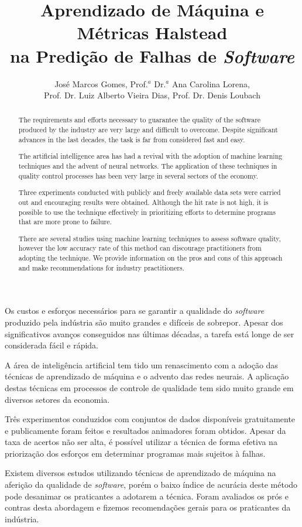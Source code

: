 \documentclass[10pt]{article}
\title{Aprendizado de Máquina e Métricas \textbf{Halstead}\\na Predição de Falhas de \textit{Software}}
\author{
    José Marcos Gomes\inst{1}\orcidIcon{0000-0001-9223-7512},
    Prof.$^a$ Dr.$^a$ Ana Carolina Lorena\inst{1}\orcidIcon{0000-0002-6140-571X}, \\
    Prof. Dr. Luiz Alberto Vieira Dias\inst{1}\orcidIcon{0000-0001-5958-8011},
    Prof. Dr. Denis Loubach\inst{1}\orcidIcon{0000-0003-1595-3448}
}
\begin{document}
 

\maketitle

\begin{abstract}
    The requirements and efforts necessary to guarantee the quality of the software produced by the industry are very large and difficult to overcome. Despite significant advances in the last decades, the task is far from considered fast and easy.

    The artificial intelligence area has had a revival with the adoption of machine learning techniques and the advent of neural networks. The application of these techniques in quality control processes has been very large in several sectors of the economy.

    Three experiments conducted with publicly and freely available data sets were carried out and encouraging results were obtained. Although the hit rate is not high, it is possible to use the technique effectively in prioritizing efforts to determine programs that are more prone to failure.

    There are several studies using machine learning techniques to assess software quality, however the low accuracy rate of this method can discourage practitioners from adopting the technique. We provide information on the pros and cons of this approach and make recommendations for industry practitioners.
\end{abstract}
     
\begin{resumo}
    Os custos e esforços necessários para se garantir a qualidade do \textit{software} produzido pela indústria são muito grandes e difíceis de sobrepor. Apesar dos significativos avanços conseguidos nas últimas décadas, a tarefa está longe de ser considerada fácil e rápida.

    A área de inteligência artificial tem tido um renascimento com a adoção das técnicas de aprendizado de máquina e o advento das redes neurais. A aplicação destas técnicas em processos de controle de qualidade tem sido muito grande em diversos setores da economia.

    Três experimentos conduzidos com conjuntos de dados disponíveis gratuitamente e publicamente foram feitos e resultados animadores foram obtidos. Apesar da taxa de acertos não ser alta, é possível utilizar a técnica de forma efetiva na priorização dos esforços em determinar programas mais sujeitos à falhas.

    Existem diversos estudos utilizando técnicas de aprendizado de máquina na aferição da qualidade de \textit{software}, porém o baixo índice de acurácia deste método pode desanimar os praticantes a adotarem a técnica. Foram avaliados os prós e contras desta abordagem e fizemos recomendações gerais para os praticantes da indústria.
\end{resumo}
\end{document}
